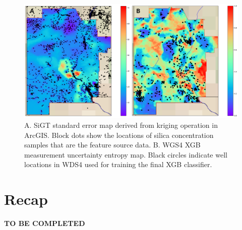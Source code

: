 \begin{figure}[!htp]
\centering
\includegraphics[width=\textwidth]{templates/images/Figure-MU_StdErr_vs_Uncert.png}
\caption[SiGT standard error and model entropy]
{A. SiGT standard error map derived from kriging operation in ArcGIS. Block dots show the locations of silica concentration samples that are the feature source data. B. WGS4 XGB measurement uncertainty entropy map. Black circles indicate well locations in WDS4 used for training the final XGB classifier. }
\label{fig:mu_stderr_entropy}
\end{figure}

\section{Recap}\label{ch5:recap}
\textbf{TO BE COMPLETED}